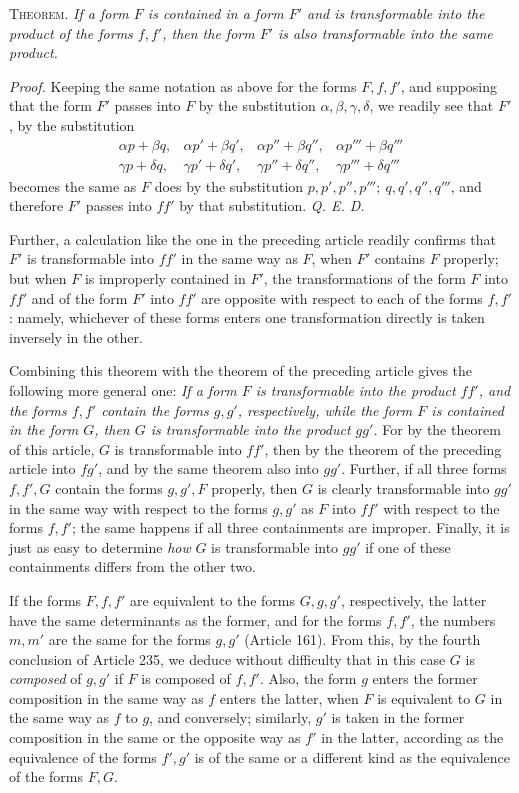 \textsc{Theorem.} \textit{If a form $F$ is contained in a form $F'$ and is transformable into the product of the forms $f,f'$, then the form $F'$ is also transformable into the same product.}

\textit{Proof.} Keeping the same notation as above for the forms $F,f,f'$, and supposing that the form $F'$ passes into $F$ by the substitution $\alpha,\beta,\gamma,\delta$, we readily see that $F'$, by the substitution
\[
\begin{array}{llll}
\alpha p+\beta q,&\alpha p'+\beta q',&\alpha p''+\beta q'',&\alpha p'''+\beta q'''\\
\gamma p+\delta q,&\gamma p'+\delta q',&\gamma p''+\delta q'',&\gamma p'''+\delta q'''
\end{array}
\]
becomes the same as $F$ does by the substitution $p,p',p'',p''';\ q,q',q'',q'''$, and therefore $F'$ passes into $ff'$ by that substitution. \textit{Q. E. D.}

Further, a calculation like the one in the preceding article readily confirms that $F'$ is transformable into $ff'$ in the same way as $F$, when $F'$ contains $F$ properly; but when $F$ is improperly contained in $F'$, the transformations of the form $F$ into $ff'$ and of the form $F'$ into $ff'$ are opposite with respect to each of the forms $f,f'$: namely,
whichever of these forms enters one transformation directly is taken inversely in the other.

Combining this theorem with the theorem of the preceding article gives the following more general one: \textit{If a form $F$ is transformable into the product $ff'$, and the forms $f,f'$ contain the forms $g,g'$, respectively, while the form $F$ is contained in the form $G$, then $G$ is transformable into the product $gg'$.} For by the theorem of this article, $G$ is transformable into $ff'$, then by the theorem of the preceding article into $fg'$, and by the same theorem also into $gg'$. Further, if all three forms $f,f',G$ contain the forms $g,g',F$ properly, then $G$ is clearly transformable into $gg'$ in the same way with respect to the forms $g,g'$ as $F$ into $ff'$ with respect to the forms $f,f'$; the same happens if all three containments are improper. Finally, it is just as easy to determine \textit{how} $G$ is transformable into $gg'$ if one of these containments differs from the other two.

If the forms $F,f,f'$ are equivalent to the forms $G,g,g'$, respectively, the latter have the same determinants as the former, and for the forms $f,f'$, the numbers $m,m'$ are the same for the forms $g,g'$ (Article 161). From this, by the fourth conclusion of Article 235, we deduce without difficulty that in this case $G$ is \textit{composed} of $g,g'$ if $F$ is composed of $f,f'$. Also, the form $g$ enters the former composition in the same way as $f$ enters the latter, when $F$ is equivalent to $G$ in the same way as $f$ to $g$, and conversely; similarly, $g'$ is taken in the former composition in the same or the opposite way as $f'$ in the latter, according as the equivalence of the forms $f',g'$ is of the same or a different kind as the equivalence of the forms $F,G$.

